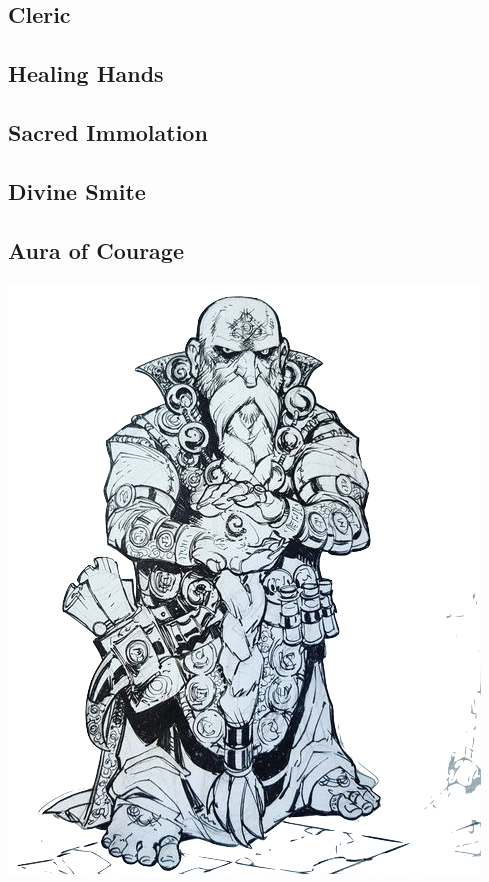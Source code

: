 
\begin{multicols*}{2}

\section{Cleric}

\subsection*{Healing Hands}

\subsection*{Sacred Immolation}

\subsection*{Divine Smite}

\subsection*{Aura of Courage}

\begin{Figure}
\centering
\includegraphics[width=\textwidth]{img/cleric.png}
\end{Figure}
    
\end{multicols*}

    